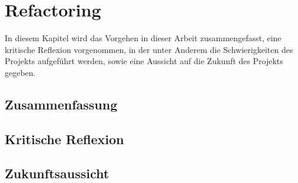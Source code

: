 \chapter{Refactoring}

In diesem Kapitel wird das Vorgehen in dieser Arbeit zusammengefasst, eine kritische Reflexion vorgenommen, in der unter Anderem die Schwierigkeiten des Projekts aufgeführt werden, sowie eine Aussicht auf die Zukunft des Projekts gegeben. 

\section{Zusammenfassung}


\section{Kritische Reflexion}


\section{Zukunftsaussicht}